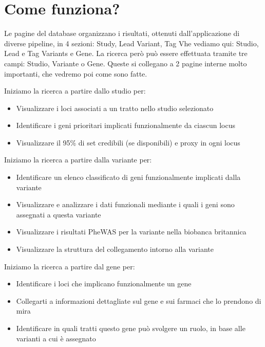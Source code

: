 \documentclass{article}
\begin{document}
\section*{Come funziona?}
Le pagine del database organizzano i risultati, ottenuti dall'applicazione di diverse pipeline, in 4 sezioni: Study, Lead Variant, Tag Vhe vediamo qui: Studio, Lead e Tag Variants e Gene. 
La ricerca però può essere effettuata tramite tre campi: Studio, Variante o Gene. Queste si collegano a 2 pagine interne molto importanti, che vedremo poi come sono fatte.
\normalsize
\begin{box4}
    [title={\textbf{Ricerca per Studio}}]
    {Iniziamo la ricerca a partire dallo studio per:
    \begin{itemize}
        \item Visualizzare i loci associati a un tratto nello studio selezionato
        \item Identificare i geni prioritari implicati funzionalmente da ciascun locus
        \item Visualizzare il 95\% di set credibili (se disponibili) e proxy in ogni locus
    \end{itemize}}
\end{box4}
\begin{box4}
    [title={\textbf{Ricerca per Variante}}]
    {Iniziamo la ricerca a partire dalla variante per:
    \begin{itemize}
        \item Identificare un elenco classificato di geni funzionalmente implicati dalla variante
        \item Visualizzare e analizzare i dati funzionali mediante i quali i geni sono assegnati a questa variante
        \item Visualizzare i risultati PheWAS per la variante nella biobanca britannica
        \item Visualizzare la struttura del collegamento intorno alla variante
    \end{itemize}}
\end{box4}
\begin{box4}
    [title={\textbf{Ricerca per Gene}}]
    {Iniziamo la ricerca a partire dal gene per:
    \begin{itemize}
        \item Identificare i loci che implicano funzionalmente un gene
        \item Collegarti a informazioni dettagliate sul gene e sui farmaci che lo prendono di mira
        \item Identificare in quali tratti questo gene può svolgere un ruolo, in base alle varianti a cui è assegnato
    \end{itemize}}
\end{box4}
\end{document}
